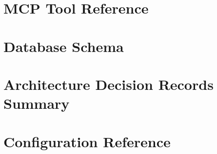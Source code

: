 \documentclass[a4paper,twoside]{sapthesis}
\begin{document}
\chapter{MCP Tool Reference}
\label{app:tool-reference}
%
%
%
%
%
%

\chapter{Database Schema}
\label{app:database-schema}

\chapter{Architecture Decision Records Summary}
\label{app:adr-summary}

\chapter{Configuration Reference}
\label{app:config-reference}
\end{document}
